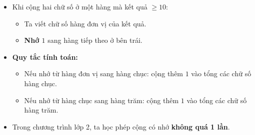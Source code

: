 \documentclass[10pt,a4paper]{article}
\begin{document}
\noindent
\begin{minipage}[t]{0.49\textwidth}\vspace{0pt}
\begin{tcolorbox}[
  enhanced,
  colback=violet!4!white,
  colframe=violet!75!black,
  arc=2mm, boxrule=0.8pt,
  left=2mm, right=2mm, top=1.8mm, bottom=1.8mm,
  title={\footnotesize\bfseries\color{white}\faKey\ 1. Quy tắc cộng có nhớ}
]
{\footnotesize
\begin{itemize}\setlength{\itemsep}{1pt}\setlength{\leftskip}{-2.5mm}
  \item Khi cộng hai chữ số ở một hàng mà kết quả $\ge 10$:
  \begin{itemize}\setlength{\itemsep}{0.5pt}\setlength{\leftskip}{-2mm}
    \item Ta viết chữ số hàng đơn vị của kết quả.
    \item \textbf{Nhớ $1$} sang hàng tiếp theo ở bên trái.
  \end{itemize}
  \item \textbf{Quy tắc tính toán:}
  \begin{itemize}\setlength{\itemsep}{0.5pt}\setlength{\leftskip}{-2mm}
    \item Nếu nhớ từ hàng đơn vị sang hàng chục: cộng thêm $1$ vào tổng các chữ số hàng chục.
    \item Nếu nhớ từ hàng chục sang hàng trăm: cộng thêm $1$ vào tổng các chữ số hàng trăm.
  \end{itemize}
  \item Trong chương trình lớp 2, ta học phép cộng có nhớ \textbf{không quá 1 lần}.
\end{itemize}
}
\end{tcolorbox}
\end{minipage}
\hfill
\end{document}
